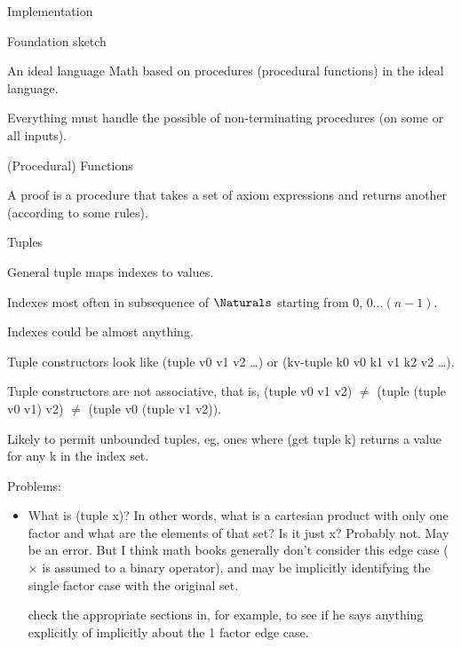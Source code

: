 \documentclass[12pt]{PalisadesLakesBook}
\begin{document}
\begin{plSection}{Implementation}
\begin{plSection}{Foundation sketch}
\begin{plSection}{An ideal language}
Math based on procedures (procedural functions) 
in the ideal language.

Everything must handle the possible of non-terminating procedures
(on some or all inputs).
\end{plSection}%
\begin{plSection}{(Procedural) Functions} 

A proof is a procedure that takes a set of axiom expressions
and returns another (according to some rules).

\end{plSection}%
\begin{plSection}{Tuples} 

General tuple maps indexes to values.

Indexes most often in subsequence of $\Naturals$ starting from
$0$, $0 \ldots (n-1)$.

Indexes could be almost anything.

Tuple constructors look like
{\pseudocodeFont (tuple v0 v1 v2 {\ldots})} 
or
{\pseudocodeFont (kv-tuple k0 v0 k1 v1 k2 v2 {\ldots})}.

Tuple constructors are not associative, that is,
  {\pseudocodeFont (tuple v0 v1 v2)}
  $\neq$
  {\pseudocodeFont (tuple (tuple v0 v1) v2)}
$\neq$
  {\pseudocodeFont (tuple v0 (tuple v1 v2))}.


Likely to permit unbounded tuples, eg, ones where
{\pseudocodeFont (get tuple k)}
returns a value for any {\pseudocodeFont k} in the index set.

Problems:
\begin{itemize}
  \item What is {\pseudocodeFont (tuple x)}?
  In other words, what is a cartesian product 
  with only one factor and what are the elements of that set?
  Is it just {\pseudocodeFont x}? 
  Probably not. May be an error.
  But I think math books generally don't consider this edge case
  ($\times$ is assumed to a binary operator),
  and may  be implicitly identifying the single factor case
  with the original set.
  
  \TODO check the appropriate sections in,
  for example, 
  to see if he says anything explicitly of implicitly about
  the 1 factor edge case.
  

\end{itemize}
\end{plSection}
\end{plSection}
\end{plSection}
\end{document}

